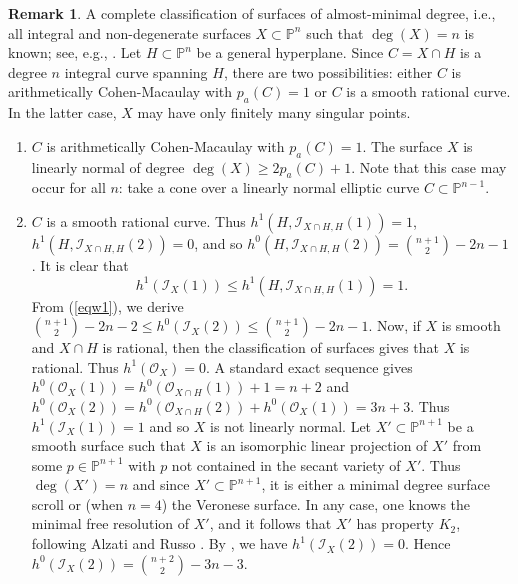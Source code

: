 \documentclass[a4, 11pt]{amsart}
\theoremstyle{plain}
\theoremstyle{definition}
\newtheorem{remark}[theorem]{Remark}
\newcommand{\enm}[1]{\ensuremath{#1}}          %
\newcommand{\cal}[1]{\mathcal{#1}}
\newcommand{\PP}{\enm{\mathbb{P}}}
\newcommand{\Ii}{\enm{\cal{I}}}
\newcommand{\Oo}{\enm{\cal{O}}}
\begin{document}
\begin{remark}\label{w3}
A complete classification of surfaces  of almost-minimal degree, i.e., all integral and non-degenerate surfaces $X\subset \PP^n$ such that $\deg (X) =n$ is known; see, e.g., \cite{hsv, park1}. Let $H\subset \PP^n$ be a general hyperplane. Since $C=X\cap H$ is a degree $n$ integral curve spanning $H$, there are two possibilities: either $C$ is arithmetically Cohen-Macaulay with $p_a(C) =1$ or $C$ is a smooth rational curve. In the latter case, $X$ may have only finitely many singular points. 

\begin{enumerate}
\item[(i)] $C$ is arithmetically Cohen-Macaulay with $p_a({C}) =1$. The surface $X$ is linearly normal of degree $\deg(X)\geq 2p_a(C)+1$. Note that this case may occur for all $n$: take a cone over a linearly normal elliptic curve $C\subset \PP^{n-1}$. 
\vspace{3mm}
\item[(ii)] $C$ is a smooth rational curve. Thus $h^1(H,\Ii _{X\cap H,H}(1)) =1$, $h^1(H,\Ii _{X\cap H,H}(2)) =0$, 
and so $h^0(H,\Ii _{X\cap H,H}(2)) = \binom{n+1}{2} -2n-1$. It is clear that
\[
h^1(\Ii _X(1)) \le h^1(H,\Ii _{X\cap H,H}(1)) =1.
\]
From (\ref{eqw1}), we derive $\binom{n+1}{2} -2n-2\le h^0(\Ii _X(2)) \le \binom{n+1}{2} -2n-1$. Now, if $X$ is smooth and $X\cap H$ is rational, then the classification of surfaces gives that $X$ is rational. Thus $h^1(\Oo _X)=0$. A standard exact sequence gives $h^0(\Oo _X(1)) =h^0(\Oo _{X\cap H}(1)) +1=n+2$ and $h^0(\Oo _X(2))= h^0(\Oo _{X\cap H}(2)) +h^0(\Oo _X(1)) = 3n+3$. Thus $h^1(\Ii _X(1)) =1$ and so $X$ is not linearly normal. Let $X'\subset \PP^{n+1}$ be a smooth surface such that $X$ is an isomorphic linear projection of $X'$ from some $p\in \PP^{n+1}$ with $p$ not contained in the secant variety of $X'$. Thus $\deg(X') = n$ and since $X'\subset \PP^{n+1}$, it is either a minimal degree surface scroll or (when $n=4$) the Veronese surface. In any case, one knows the minimal free resolution of $X'$, and it follows that $X'$ has property $K_2$, following Alzati and Russo \cite[Definition 3.1]{ar}.  By \cite[Theorem 3.2 or Corollary 3.3]{ar}, we have $h^1(\Ii _X(2))=0$. Hence $h^0(\Ii _X(2)) =\binom{n+2}{2} -3n-3$.
\end{enumerate}

\end{remark}
\end{document}
